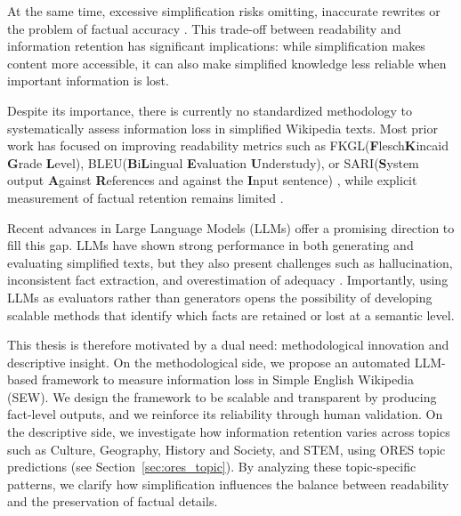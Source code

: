 \documentclass{DESSThesis}
\begin{document}
At the same time, excessive simplification risks omitting, inaccurate rewrites or the problem of factual accuracy \cite{agrawal2024text, Zhong_Jiang_Xu_Li_2020, devaraj2022evaluating, trienes2024infolossqacharacterizingrecoveringinformation}. This trade-off between readability and information retention has significant implications: while simplification makes content more accessible, it can also make simplified knowledge less reliable when important information is lost\cite{cripwell2024evaluating}.

Despite its importance, there is currently no standardized methodology to systematically assess information loss in simplified Wikipedia texts. Most prior work has focused on improving readability metrics such as FKGL(\textbf{F}lesch\textbf{K}incaid \textbf{G}rade \textbf{L}evel)\cite{tanprasert-kauchak-2021-flesch, beauchemin2023meaningbert}, BLEU(\textbf{B}i\textbf{L}ingual \textbf{E}valuation \textbf{U}nderstudy)\cite{sulem2018bleu, beauchemin2023meaningbert}, or SARI(\textbf{S}ystem output \textbf{A}gainst \textbf{R}eferences and against the \textbf{I}nput sentence) \cite{xu2016optimizing,beauchemin2023meaningbert}, while explicit measurement of factual retention remains limited \cite{davari2024comparative, cachola2025evaluating}. 

Recent advances in Large Language Models (LLMs) offer a promising direction to fill this gap\cite{kew2023bless, fang2025progressivedocumentleveltextsimplification}. LLMs have shown strong performance in both generating and evaluating simplified texts, but they also present challenges such as hallucination, inconsistent fact extraction, and overestimation of adequacy \cite{farquhar2024detecting, huang2025survey, asgari2025framework, sawczyn2025factselfcheckfactlevelblackboxhallucination, shen2023large}. Importantly, using LLMs as evaluators rather than generators opens the possibility of developing scalable methods that identify which facts are retained or lost at a semantic level\cite{sawczyn2025factselfcheckfactlevelblackboxhallucination}.

This thesis is therefore motivated by a dual need: methodological innovation and descriptive insight. On the methodological side, we propose an automated LLM-based framework to measure information loss in Simple English Wikipedia (SEW). We design the framework to be scalable and transparent by producing fact-level outputs, and we reinforce its reliability through human validation. On the descriptive side, we investigate how information retention varies across topics such as Culture, Geography, History and Society, and STEM, using ORES topic predictions (see Section~\ref{sec:ores_topic}). By analyzing these topic-specific patterns, we clarify how simplification influences the balance between readability and the preservation of factual details.
\end{document}
